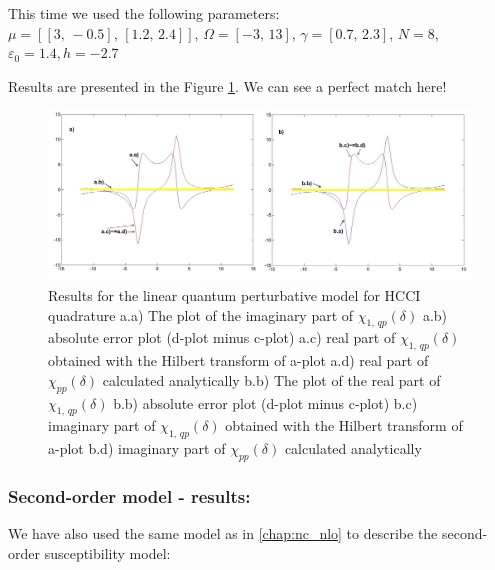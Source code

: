 \documentclass[12pt,twoside,a4paper]{article}
\numberwithin{equation}{subsection}
\numberwithin{figure}{subsection}
\begin{document}
This time we used the following parameters: \\
$\mu = [[3, \, - 0.5], \,[1.2, \,2.4]]$, 
$\Omega =[ - 3, \,13]$, 
$\gamma =[0.7, \,2.3]$,  
$N=8$, 
${\varepsilon_{0}}=1.4, 
h= - 2.7$

Results are presented in the Figure \ref{fig:hcc_qp1}. We can see a perfect match here!

\begin{figure}
  \includegraphics[width=150mm]{img/hcc_qp1.png}
  \caption{Results for the linear quantum perturbative model for HCCI quadrature
    a.a) The plot of the imaginary part of ${\chi_{1, \,qp}}(\delta )$
    a.b) absolute error plot (d-plot minus c-plot) 
    a.c) real part of ${\chi_{1, \,qp}}(\delta )$ obtained with the Hilbert transform of a-plot 
    a.d) real part of ${\chi_{pp}}(\delta )$ calculated analytically 
    b.b) The plot of the real part of ${\chi_{1, \,qp}}(\delta )$ 
    b.b) absolute error plot (d-plot minus c-plot) 
    b.c) imaginary part of ${\chi_{1, \,qp}}(\delta )$ obtained with the Hilbert transform of a-plot 
    b.d) imaginary part of ${\chi_{pp}}(\delta )$ calculated analytically  
    \label{fig:hcc_qp1}
  }
\end{figure}

\subsubsection*{Second-order model - results:}

We have also used the same model as in \ref{chap:nc_nlo} to describe the second-order susceptibility model:
\end{document}
